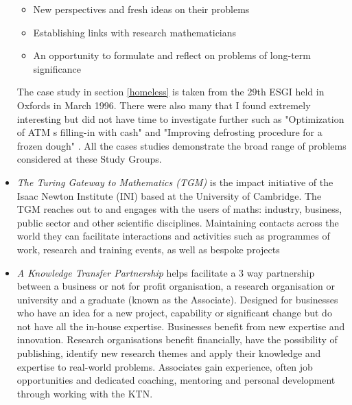 \documentclass[11pt]{article} %
\begin{document}
\begin{itemize}
\begin{itemize}
			\item New perspectives and fresh ideas on their problems
			\item Establishing links with research mathematicians
			\item An opportunity to formulate and reflect on problems  of long-term significance
		\end{itemize}	
		The case study in section \ref{homeless} is taken from the 29th ESGI held in Oxfords in March 1996. There were also many that I found extremely interesting but did not have time to investigate further such as  "Optimization of ATM s filling-in with cash" \cite{Broda} and "Improving defrosting procedure for a frozen dough" \cite{Luci}. All the cases studies demonstrate the broad range of problems considered at these Study Groups. 
		\item \textit{The Turing Gateway to Mathematics (TGM)} is the impact initiative of the Isaac Newton Institute (INI) based at the University of Cambridge. The TGM reaches out to and engages with the users of maths: industry, business, public sector and other scientific disciplines. Maintaining contacts across the world they can facilitate interactions and activities such as programmes of work, research and training events, as well as bespoke projects
		\item  \textit{A Knowledge Transfer Partnership} helps facilitate a 3 way partnership between a business or not for profit organisation, a research organisation or university and a graduate (known as the Associate). Designed for businesses who have an idea for a new project, capability or significant change but  do not have all the in-house expertise. Businesses benefit from new expertise and innovation. Research organisations benefit financially, have the possibility of publishing, identify new research themes and apply their knowledge and expertise to real-world problems. Associates gain experience, often job opportunities and dedicated coaching, mentoring and personal development through working with the KTN.
		 
		
	
	\end{itemize}
\end{document}
